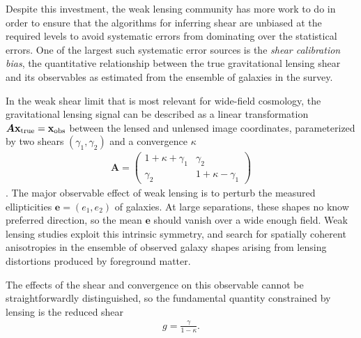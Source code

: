 \documentclass[iop]{emulateapj}
\begin{document}
Despite this investment, the weak lensing community has more work to
do in order to ensure that the algorithms for inferring shear are
unbiased at the required levels to avoid systematic errors from
dominating over the statistical errors. One of the largest such
systematic error sources is the {\it shear calibration bias}, the
quantitative relationship between the true gravitational lensing shear 
and its observables as estimated from the ensemble of galaxies in the survey.

In the weak shear limit that is most relevant for wide-field cosmology, the
gravitational lensing signal can be described as a linear
transformation
$\boldsymbol{A}\mathbf{x}_{\rm true} = \mathbf{x}_{\rm obs}$ between
the lensed and unlensed image coordinates, parameterized by two shears
$(\gamma_1,\gamma_2)$ and a convergence $\kappa$
\begin{align}
\boldsymbol{A}=
\begin{pmatrix}
1 + \kappa + \gamma_1 & \gamma_2 \\
\gamma_2 & 1 + \kappa - \gamma_1
\end{pmatrix}
\end{align}.
The major observable effect of weak lensing is to perturb the measured
ellipticities $\mathbf{e} = (e_1,e_2)$ of galaxies. At large
separations, these shapes no know preferred direction, so the mean
$\mathbf{e}$ should vanish over a wide enough field. Weak lensing
studies exploit this intrinsic symmetry, and search for spatially
coherent anisotropies in the ensemble of observed galaxy shapes
arising from lensing distortions produced by foreground matter.

The effects of the shear and convergence on this observable cannot be
straightforwardly distinguished, so the fundamental quantity
constrained by lensing is the reduced shear
\begin{align}
 g = \frac{\gamma}{1 - \kappa}.
\end{align}
\end{document}
